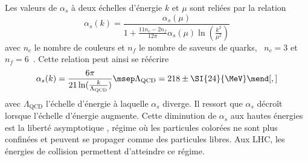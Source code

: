 \par Les valeurs de $\alpha_s$ à deux échelles d'énergie $k$ et $\mu$ sont reliées par la relation
\begin{equation}
\alpha_s(k) = \frac{\alpha_s(\mu)}{1+ \frac{11n_c-2n_f}{12\pi} \alpha_s(\mu)\ln(\frac{k^2}{\mu^2})}
\end{equation}
avec $n_c$ le nombre de couleurs et $n_f$ le nombre de saveurs de quarks, \ie\ $n_c=3$ et $n_f=6$~\cite{salam2010elements}.
Cette relation peut ainsi se réécrire
\begin{equation}
\alpha_s (k) =
\frac{6\pi}{21 \ln(\frac{k}{\Lambda_\text{QCD}})}
\msep
\Lambda_\text{QCD} = 218\pm\SI{24}{\MeV}
\mend[,]
\end{equation}
avec $\Lambda_\text{QCD}$ l'échelle d'énergie à laquelle $\alpha_s$ diverge.
Il ressort que $\alpha_s$ décroît lorsque l'échelle d'énergie augmente.
Cette diminution de $\alpha_s$ aux hautes énergies est la \og liberté asymptotique \fg, régime où les particules colorées ne sont plus confinées et peuvent se propager comme des particules libres. Aux LHC, les énergies de collision permettent d'atteindre ce régime.
